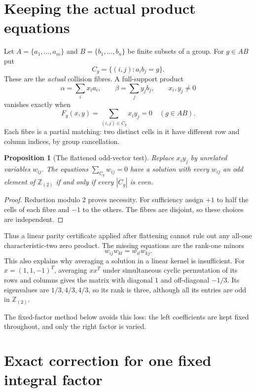 \documentclass[11pt,a4paper,oneside]{report}
\newtheorem{proposition}[theorem]{Proposition}
\theoremstyle{definition}
\theoremstyle{remark}
\newcommand{\Z}{\mathbb Z}
\begin{document}
\section{Keeping the actual product equations}

Let $A=\{a_1,\ldots,a_m\}$ and $B=\{b_1,\ldots,b_n\}$ be finite
subsets of a group. For $g\in AB$ put
\[
C_g=\{(i,j):a_i b_j=g\}.
\]
These are the \emph{actual} collision fibres. A full-support product
\[
\alpha=\sum_i x_i a_i,\qquad \beta=\sum_j y_j b_j,
\qquad x_i,y_j\ne0
\]
vanishes exactly when
\begin{equation}\label{M04:eq:fibres}
F_g(x,y)=\sum_{(i,j)\in C_g}x_i y_j=0\quad(g\in AB).
\end{equation}
Each fibre is a partial matching: two distinct cells in it have
different row and column indices, by group cancellation.

\begin{proposition}[The flattened odd-vector test]\label{M04:prop:flat}
Replace $x_i y_j$ by unrelated variables $w_{ij}$. The equations
$\sum_{C_g}w_{ij}=0$ have a solution with every $w_{ij}$ an odd element
of $\Z_{(2)}$ if and only if every $|C_g|$ is even.
\end{proposition}
\begin{proof}
Reduction modulo $2$ proves necessity. For sufficiency assign $+1$ to
half the cells of each fibre and $-1$ to the others. The fibres are
disjoint, so these choices are independent.
\end{proof}

Thus a linear parity certificate applied after flattening cannot rule
out any all-one characteristic-two zero product. The missing equations
are the rank-one minors
\[
w_{ij}w_{kl}=w_{il}w_{kj}.
\]
This also explains why averaging a solution in a linear kernel is
insufficient. For $x=(1,1,-1)^T$, averaging $xx^T$ under simultaneous
cyclic permutation of its rows and columns gives the matrix with
diagonal $1$ and off-diagonal $-1/3$. Its eigenvalues are
$1/3,4/3,4/3$, so its rank is three, although all its entries are odd
in $\Z_{(2)}$.

The fixed-factor method below avoids this loss: the left coefficients
are kept fixed throughout, and only the right factor is varied.

\section{Exact correction for one fixed integral factor}
\end{document}
